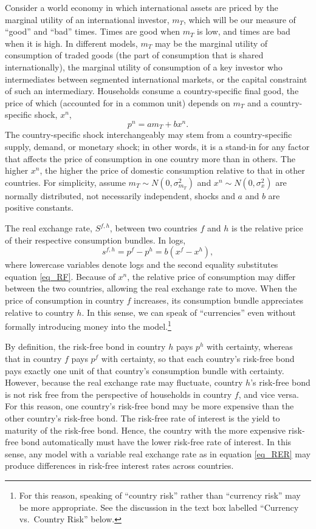 \documentclass{ar-1col}
\begin{document}
Consider a world economy in which international assets are priced by the marginal utility of an international investor, $m_T$, which will be our measure of ``good'' and ``bad'' times. Times are good when $m_T$ is low, and times are bad when it is high. In different models, $m_T$ may be the marginal utility of consumption of traded goods (the part of consumption that is shared internationally), the marginal utility of consumption of a key investor who intermediates between segmented international markets, or the capital constraint of such an intermediary. Households consume a country-specific final good, the price of which (accounted for in a common unit) depends on $m_T$ and a country-specific shock, $x^n$,
\begin{equation}
  p^{n} = a m_T + b x^{n}.  
  \label{eq_RF}
\end{equation}%
The country-specific shock interchangeably may stem from a country-specific supply, demand, or monetary shock; in other words, it is a stand-in for any factor that affects the price of consumption in one country more than in others. The higher $x^{n}$, the higher the price of domestic consumption relative to that in other countries. For simplicity, assume $m_{T} \sim N(0, \sigma^2_{m_{T}})$ and $x^{n} \sim N(0,\sigma^2_x) $ are normally distributed, not necessarily independent, shocks and $a$ and $b$ are positive constants.

The real exchange rate, $S^{f, h}$, between two countries $f$ and $h$ is the relative price of their respective consumption bundles. In logs,
\begin{equation}
  s^{f,h} 
  = p^f - p^h 
  = b(x^f - x^h),
\label{eq_RER}
\end{equation}
where lowercase variables denote logs and the second equality substitutes equation \ref{eq_RF}. Because of $x^{n}$, the relative price of consumption may differ between the two countries, allowing the real exchange rate to move. When the price of consumption in country $f$ increases, its consumption bundle appreciates relative to country $h$. In this sense, we can speak of ``currencies'' even without formally introducing money into the model.\footnote{For this reason, speaking of ``country risk'' rather than ``currency risk'' may be more appropriate. See the discussion in the text box labelled ``Currency vs.~Country Risk'' below. }

By definition, the risk-free bond in country $h$ pays $p^h$ with certainty, whereas that in country $f$ pays $p^f$ with certainty, so that each country's risk-free bond pays exactly one unit of that country's consumption bundle with certainty. However, because the real exchange rate may fluctuate, country $h$'s risk-free bond is not risk free from the perspective of households in country $f$, and vice versa. For this reason, one country's risk-free bond may be more expensive than the other country's risk-free bond. The risk-free rate of interest is the yield to maturity of the risk-free bond.  Hence, the country with the more expensive risk-free bond automatically must have the lower risk-free rate of interest. In this sense, any model with a variable real exchange rate as in equation \ref{eq_RER} may produce differences in risk-free interest rates across countries.
\end{document}
